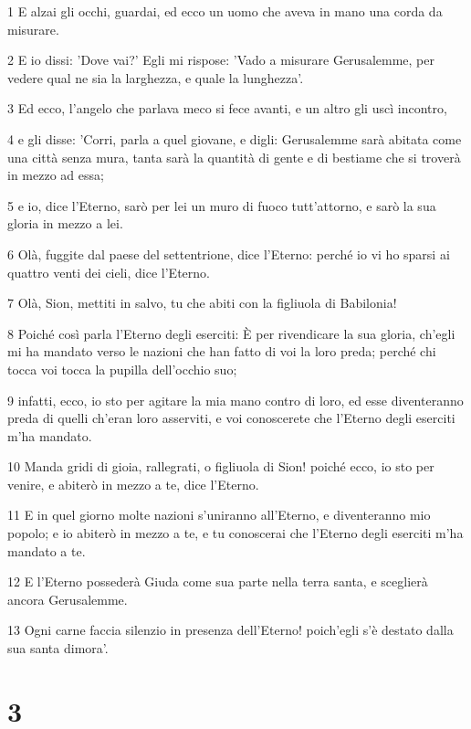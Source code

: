 \par 1 E alzai gli occhi, guardai, ed ecco un uomo che aveva in mano una corda da misurare.
\par 2 E io dissi: 'Dove vai?' Egli mi rispose: 'Vado a misurare Gerusalemme, per vedere qual ne sia la larghezza, e quale la lunghezza'.
\par 3 Ed ecco, l'angelo che parlava meco si fece avanti, e un altro gli uscì incontro,
\par 4 e gli disse: 'Corri, parla a quel giovane, e digli: Gerusalemme sarà abitata come una città senza mura, tanta sarà la quantità di gente e di bestiame che si troverà in mezzo ad essa;
\par 5 e io, dice l'Eterno, sarò per lei un muro di fuoco tutt'attorno, e sarò la sua gloria in mezzo a lei.
\par 6 Olà, fuggite dal paese del settentrione, dice l'Eterno: perché io vi ho sparsi ai quattro venti dei cieli, dice l'Eterno.
\par 7 Olà, Sion, mettiti in salvo, tu che abiti con la figliuola di Babilonia!
\par 8 Poiché così parla l'Eterno degli eserciti: È per rivendicare la sua gloria, ch'egli mi ha mandato verso le nazioni che han fatto di voi la loro preda; perché chi tocca voi tocca la pupilla dell'occhio suo;
\par 9 infatti, ecco, io sto per agitare la mia mano contro di loro, ed esse diventeranno preda di quelli ch'eran loro asserviti, e voi conoscerete che l'Eterno degli eserciti m'ha mandato.
\par 10 Manda gridi di gioia, rallegrati, o figliuola di Sion! poiché ecco, io sto per venire, e abiterò in mezzo a te, dice l'Eterno.
\par 11 E in quel giorno molte nazioni s'uniranno all'Eterno, e diventeranno mio popolo; e io abiterò in mezzo a te, e tu conoscerai che l'Eterno degli eserciti m'ha mandato a te.
\par 12 E l'Eterno possederà Giuda come sua parte nella terra santa, e sceglierà ancora Gerusalemme.
\par 13 Ogni carne faccia silenzio in presenza dell'Eterno! poich'egli s'è destato dalla sua santa dimora'.

\chapter{3}

